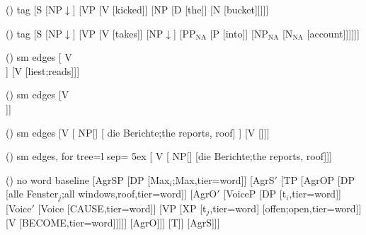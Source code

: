 \begin {forest}()
 tag [S [NP$\downarrow $] [VP [V [kicked]] [NP [D [the]] [N [bucket]]]]] \end {forest}
\begin {forest}()
 tag [S [NP$\downarrow $] [VP [V [takes]] [NP$\downarrow $] [PP$_{{\mathrm {NA}}}$ [P [into]] [NP$_{\mathrm {NA}}$ [N$_{\mathrm {NA}}$ [account]]]]]] \end {forest}
\begin {forest}()
 sm edges [ V\\ [{\ibox {4} \feattab { \textsc {loc} \ibox {1},\\ \textsc {inher$|$slash} \sliste { \ibox {1} }}} [\trace ]] [V [liest;reads]]] \end {forest}
\begin {forest}()
 sm edges [{V}\\ [V\feattab { \comps \sliste { NP[\type {nom}], NP\ibox {1}[\type {acc}] }}\\ [liest;reads]]] \end {forest}
\begin {forest}()
 sm edges [V [{ NP[]} [ die Berichte;the reports, roof] ] [V [\trace ]]] \end {forest}
\begin {forest}()
 sm edges, for tree={l sep= 5ex} [ V [{ NP[]} [die Berichte;the reports, roof]]] \end {forest}
\begin {forest}()
 no word baseline [AgrSP [DP [Max$_ i$;Max,tier=word]] [AgrS$'$ [TP [AgrOP [DP [alle Fenster$_ j$;all windows,roof,tier=word]] [AgrO$'$ [VoiceP [DP [t$_i$,tier=word]] [Voice$'$ [Voice [CAUSE,tier=word]] [VP [XP [t$_j$,tier=word] [offen;open,tier=word]] [V [BECOME,tier=word]]]]] [AgrO]]] [T]] [AgrS]]] \end {forest}
